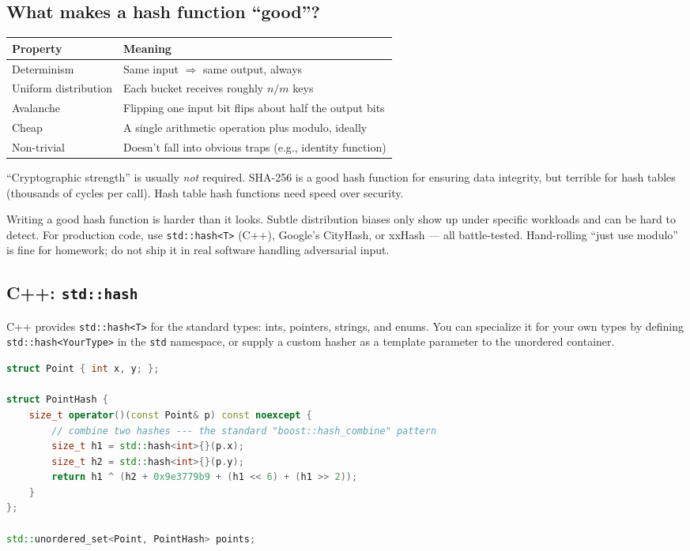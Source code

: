 \documentclass[11pt]{article}
\begin{document}
\subsection*{What makes a hash function ``good''?}

\begin{center}
\begin{tabular}{|l|p{10cm}|}
\hline
\textbf{Property} & \textbf{Meaning} \\
\hline
Determinism & Same input $\Rightarrow$ same output, always \\
Uniform distribution & Each bucket receives roughly $n/m$ keys \\
Avalanche & Flipping one input bit flips about half the output bits \\
Cheap     & A single arithmetic operation plus modulo, ideally \\
Non-trivial & Doesn't fall into obvious traps (e.g., identity function) \\
\hline
\end{tabular}
\end{center}

``Cryptographic strength'' is usually \emph{not} required. SHA-256
is a good hash function for ensuring data integrity, but
terrible for hash tables (thousands of cycles per call). Hash
table hash functions need speed over security.

\begin{warnbox}
Writing a good hash function is harder than it looks. Subtle
distribution biases only show up under specific workloads and
can be hard to detect. For production code, use
\texttt{std::hash<T>} (C++), Google's CityHash, or xxHash ---
all battle-tested. Hand-rolling ``just use modulo'' is fine for
homework; do not ship it in real software handling adversarial
input.
\end{warnbox}

\subsection*{C++: \texttt{std::hash}}

C++ provides \texttt{std::hash<T>} for the standard types: ints,
pointers, strings, and enums. You can specialize it for your own
types by defining \texttt{std::hash<YourType>} in the
\texttt{std} namespace, or supply a custom hasher as a template
parameter to the unordered container.

\begin{examplebox}
\begin{lstlisting}[language=C++,basicstyle=\ttfamily\small,frame=single]
struct Point { int x, y; };

struct PointHash {
    size_t operator()(const Point& p) const noexcept {
        // combine two hashes --- the standard "boost::hash_combine" pattern
        size_t h1 = std::hash<int>{}(p.x);
        size_t h2 = std::hash<int>{}(p.y);
        return h1 ^ (h2 + 0x9e3779b9 + (h1 << 6) + (h1 >> 2));
    }
};

std::unordered_set<Point, PointHash> points;
\end{lstlisting}
\end{examplebox}
\end{document}

